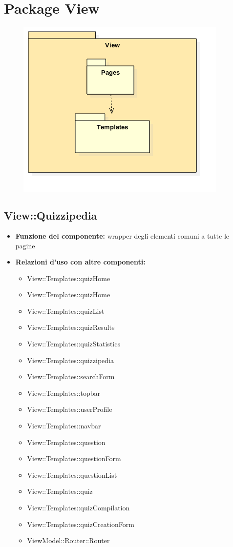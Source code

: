\section{Package View}
\begin{figure}[h!]
\begin{center}
	\includegraphics[scale=0.7]{../images/ViewPackage.png}
\end{center}
\end{figure}

\subsection{View::Quizzipedia}
\begin{itemize}
\item\textbf{Funzione del componente:} wrapper degli elementi comuni a tutte le pagine
\item\textbf{Relazioni d'uso con altre componenti:} 
\begin{itemize}
	\item View::Templates::quizHome
\item View::Templates::quizHome
\item View::Templates::quizList
\item View::Templates::quizResults
\item View::Templates::quizStatistics
\item View::Templates::quizzipedia
\item View::Templates::searchForm
\item View::Templates::topbar
\item View::Templates::userProfile
\item View::Templates::navbar
\item View::Templates::question
\item View::Templates::questionForm
\item View::Templates::questionList
\item View::Templates::quiz
\item View::Templates::quizCompilation
\item View::Templates::quizCreationForm
\item ViewModel::Router::Router
\end{itemize}
\end{itemize}

